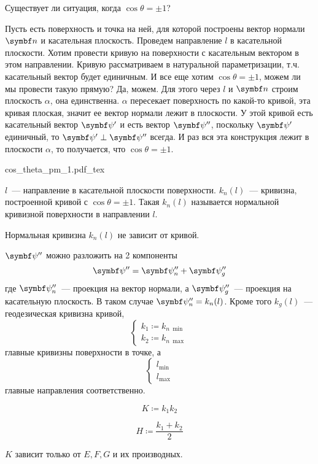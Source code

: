 \documentclass[main]{subfiles}
\begin{document}
Существует ли ситуация, когда $\cos\theta = \pm 1$?

Пусть есть поверхность и точка на ней, для которой построены вектор нормали $\vn$ и касательная плоскость.
Проведем направление $l$  в касательной плоскости.
Хотим провести кривую на поверхности с касательным вектором в этом направлении.
Кривую рассматриваем в натуральной параметризации, т.ч. касательный вектор будет единичным.
И все еще хотим  $\cos\theta = \pm 1$, можем ли мы провести такую прямую?
Да, можем.
Для этого через $l$ и $\vn$ строим плоскость $\alpha$, она единственна.
$\alpha$ пересекает поверхность по какой-то кривой, эта кривая плоская, значит ее вектор нормали лежит в плоскости.
У этой кривой есть касательный вектор $\vpsi'$ и есть вектор $\vpsi''$, поскольку $\vpsi'$ единичный, то $\vpsi' \perp \vpsi''$ всегда.
И раз вся эта конструкция лежит в плоскости $\alpha$, то получается, что $\cos\theta = \pm 1$.
\begin{center}
    {cos_theta_pm_1.pdf_tex}
\end{center}

\begin{definition}
    $l$~--- направление в касательной плоскости поверхности.
    $k_{n}(l)$~--- кривизна, построенной кривой с $\cos\theta = \pm 1$.
    Такая $k_{n}(l)$ называется нормальной кривизной поверхности в направлении $l$.
\end{definition}
\begin{theorem}[Мёнье]
    Нормальная кривизна $k_{n}(l)$ не зависит от кривой.
\end{theorem}

$\vpsi''$ можно разложить на 2 компоненты
\[\vpsi'' = \vpsi''_{n} + \vpsi''_{g}\]
где $\vpsi''_{n}$~--- проекция на вектор нормали, а $\vpsi''_{g}$~--- проекция на касательную плоскость.
В таком случае $\vpsi''_{n} = k_{n}(l)$.
Кроме того $k_{g}(l)$~--- геодезическая кривизна кривой,
\[\begin{cases}
        k_1 \coloneqq k_{n\ \min} \\
        k_2 \coloneqq k_{n\ \max}
    \end{cases}\]
главные кривизны поверхности в точке, а
\[\begin{cases}
        l_{\min} \\
        l_{\max}
    \end{cases}\]
главные направления соответственно.

\begin{definition}
    \[K \coloneqq k_1k_2 \]
\end{definition}
\begin{definition}
    \[H \coloneqq \frac{k_1 + k_2}{2}\]
\end{definition}
\begin{theorem}
    $K$ зависит только от $E,F,G$ и их производных.
\end{theorem}
\end{document}
